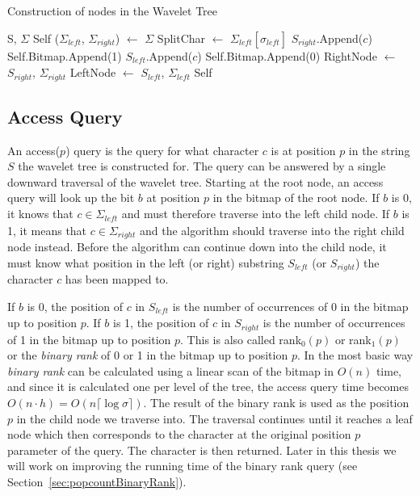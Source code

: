 \begin{algorithm}
\caption{Construction of nodes in the Wavelet Tree}
\label{alg:ConstructNode}
\begin{algorithmic}
 {S, $\Sigma$}
	\State \Return Self
\EndIf
\State ($\Sigma_{\mathit{left}}$, $\Sigma_{\mathit{right}}$) $\gets$ $\Sigma$
\State SplitChar $\gets$ $\Sigma_{\mathit{left}}[\sigma_{\mathit{left}}]$
		\State $S_{\mathit{right}}$.Append($c$)
		\State Self.Bitmap.Append(1)
	\Else
		\State $S_{\mathit{left}}$.Append($c$)
		\State Self.Bitmap.Append(0)
	\EndIf
\EndFor
\State RightNode $\gets$  {$S_{\mathit{right}}$, $\Sigma_{\mathit{right}}$}
\State LeftNode $\gets$  {$S_{\mathit{left}}$, $\Sigma_{\mathit{left}}$}
\State \Return Self
\EndFunction
\end{algorithmic}
\end{algorithm}


\subsection{Access Query}
An access($p$) query is the query for what character $c$ is at position $p$ in the string $S$ the wavelet tree is constructed for.
The query can be answered by a single downward traversal of the wavelet tree.
Starting at the root node, an access query will look up the bit $b$ at position $p$ in the bitmap of the root node.
If $b$ is 0, it knows that $c \in \Sigma_{\mathit{left}}$ and must therefore traverse into the left child node.
If $b$ is 1, it means that $c \in \Sigma_{\mathit{right}}$ and the algorithm should traverse into the right child node instead.
Before the algorithm can continue down into the child node, it must know what position in the left (or right) substring $S_{\mathit{left}}$ (or $S_{\mathit{right}}$) the character $c$ has been mapped to.

If $b$ is 0, the position of $c$ in $S_{\mathit{left}}$ is the number of occurrences of 0 in the bitmap up to position $p$.
If $b$ is 1, the position of $c$ in $S_{\mathit{right}}$ is the number of occurrences of 1 in the bitmap up to position $p$.
This is also called rank$_0(p)$ or rank$_1(p)$ or the \textit{binary rank} of 0 or 1 in the bitmap up to position $p$.
In the most basic way \textit{binary rank} can be calculated using a linear scan of the bitmap in $O(n)$ time, and since it is calculated one per level of the tree, the access query time becomes $O(n \cdot h) = O(n \lceil \log \sigma \rceil)$.
The result of the binary rank is used as the position $p$ in the child node we traverse into. 
The traversal continues  until it reaches a leaf node which then corresponds to the character at the original position $p$ parameter of the query.
The character is then returned.
Later in this thesis we will work on improving the running time of the binary rank query (see Section~\ref{sec:popcountBinaryRank}).

